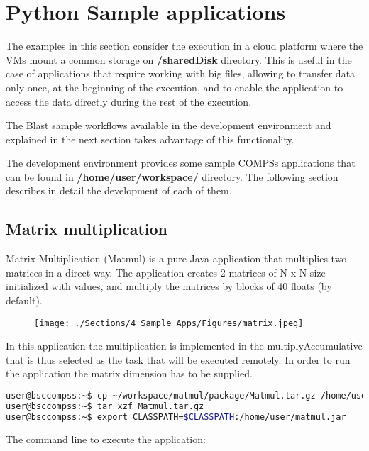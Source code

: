 \section{Python Sample applications}
\label{sec:PythonSampleApps}

The examples in this section consider the execution in a cloud platform where the VMs mount a common 
storage on {\bf /sharedDisk} directory. This is useful in the case of applications that require working 
with big files, allowing to transfer data only once, at the beginning of the execution, and to enable 
the application to access the data directly during the rest of the execution.

The Blast sample workflows available in the development environment and explained in the next section 
takes advantage of this functionality.

The development environment provides some sample COMPSs applications that can be found in 
{\bf /home/user/workspace/} directory. The following section describes in detail the development 
of each of them.

\subsection{Matrix multiplication}
Matrix Multiplication (Matmul) is a pure Java application that multiplies two matrices in a direct way. 
The application creates 2 matrices of N x N size initialized with values, and multiply the matrices by 
blocks of 40 floats (by default).

\begin{figure}[ht!]
  \centering
    \texttt{[image: ./Sections/4\_Sample\_Apps/Figures/matrix.jpeg]}
\end{figure}

In this application the multiplication is implemented in the multiplyAccumulative that is thus selected 
as the task that will be executed remotely. In order to run the application the matrix dimension has to 
be supplied.

\begin{lstlisting}[language=bash]
user@bsccompss:~$ cp ~/workspace/matmul/package/Matmul.tar.gz /home/user/
user@bsccompss:~$ tar xzf Matmul.tar.gz
user@bsccompss:~$ export CLASSPATH=$CLASSPATH:/home/user/matmul.jar
\end{lstlisting}

The command line to execute the application:

